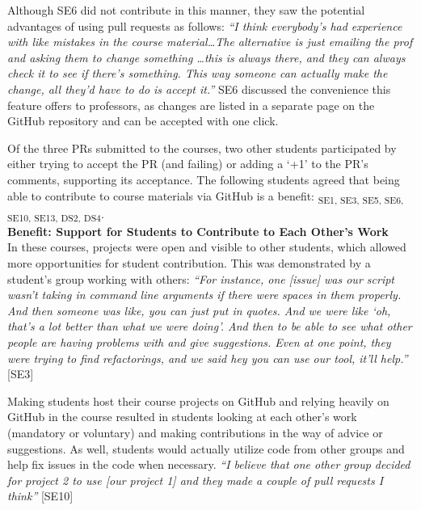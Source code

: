 Although SE6 did not contribute in this manner, they saw the potential advantages of using pull requests as follows: \textit{``I think everybody's had experience with like mistakes in the course material\ldots The alternative is just emailing the prof and asking them to change something \ldots this is always there, and they can always check it to see if there's something. This way someone can actually make the change, all they'd have to do is accept it.''} SE6 discussed the convenience this feature offers to professors, as changes are listed in a separate page on the GitHub repository and can be accepted with one click.

Of the three PRs submitted to the courses, two other students participated by either trying to accept the PR (and failing) or adding a `+1' to the PR's comments, supporting its acceptance. The following students agreed that being able to contribute to course materials via GitHub is a benefit: \textsubscript{SE1, SE3, SE5, SE6, SE10, SE13, DS2, DS4}. \\ %


\textbf{Benefit: Support for Students to Contribute to Each Other's Work} \\
In these courses, projects were open and visible to other students, which allowed more opportunities for student contribution. This was demonstrated by a student's group working with others:
\textit{``For instance, one [issue] was our script wasn't taking in command line arguments if there were spaces in them properly. And then someone was like, you can just put in quotes. And we were like `oh, that's a lot better than what we were doing'. And then to be able to see what other people are having problems with and give suggestions. Even at one point, they were trying to find refactorings, and we said hey you can use our tool, it'll help.''} [SE3]

Making students host their course projects on GitHub and relying heavily on GitHub in the course resulted in students looking at each other's work (mandatory or voluntary) and making contributions in the way of advice or suggestions. As well, students would actually utilize code from other groups and help fix issues in the code when necessary. \textit{``I believe that one other group decided for project 2 to use [our project 1] and they made a couple of pull requests I think''} [SE10]


